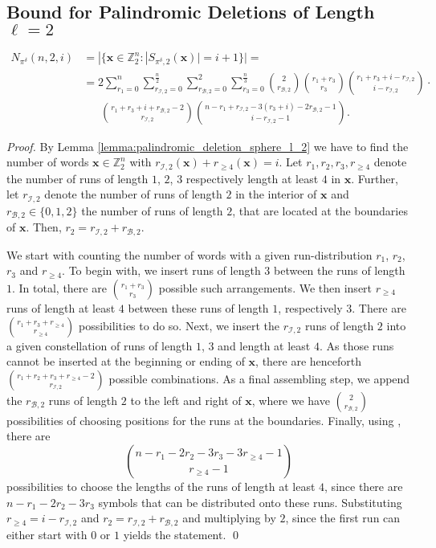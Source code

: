 \documentclass[a4paper]{llncs}
\newcommand{\ve}[1]{\boldsymbol{#1}}
\begin{document}
	\subsection{Bound for Palindromic Deletions of Length $\ell=2$}
	\begin{lemma}
		\begin{align*}
		N_{\pi^\delta}(n,2,i) &= |\{\ve{x} \in \mathbb{Z}_2^n : |S_{\pi^\delta, 2}(\ve{x})| = i+1 \}| = \\ &= 2 \sum_{r_1=0}^{n}\sum_{r_{\mathcal{I},2}=0}^{\frac{n}{2}} \sum_{r_{\mathcal{B},2} = 0}^2 \sum_{r_3=0}^{\frac{n}{3}} \binom{2}{r_{\mathcal{B},2}} \binom{r_1+r_3}{r_3} \binom{r_1+r_3+i-r_{\mathcal{I},2}}{i-r_{\mathcal{I},2}} \cdot \\  & \quad \;\; \binom{r_1+r_3+i + r_{\mathcal{B},2}-2}{r_{\mathcal{I},2}} \binom{n-r_1+r_{\mathcal{I},2}-3(r_3+i)-2r_{\mathcal{B},2}-1}{i-r_{\mathcal{I},2}-1} .
		\end{align*}
	\end{lemma}
	\begin{proof}
		By Lemma \ref{lemma:palindromic_deletion_sphere_l_2} we have to find the number of words $\ve{x}\in \mathbb{Z}_2^n$ with $r_{\mathcal{I},2}(\ve{x}) + r_{\geq 4}(\ve{x}) = i$. Let $r_1, r_2, r_3, r_{\geq 4}$ denote the number of runs of length $1$, $2$, $3$ respectively length at least $4$ in $\ve{x}$. Further, let $r_{\mathcal{I},2}$ denote the number of runs of length $2$ in the interior of $\ve{x}$ and $r_{\mathcal{B},2} \in \{0,1,2\}$ the number of runs of length $2$, that are located at the boundaries of $\ve{x}$. Then, $r_2 = r_{\mathcal{I},2} + r_{\mathcal{B},2}$.
		
		We start with counting the number of words with a given run-distribution $r_1$, $r_2$, $r_3$ and $r_{\geq 4}$. To begin with, we insert runs of length $3$ between the runs of length $1$. In total, there are $\binom{r_1+r_3}{r_3}$ possible such arrangements. We then insert $r_{\geq 4}$ runs of length at least $4$ between these runs of length $1$, respectively $3$. There are $\binom{r_1+r_3+r_{\geq 4}}{r_{\geq 4}}$ possibilities to do so. Next, we insert the $r_{\mathcal{I},2}$ runs of length $2$ into a given constellation of runs of length $1$, $3$ and length at least $4$. As those runs cannot be inserted at the beginning or ending of $\ve{x}$, there are henceforth $\binom{r_1+r_2+r_3 + r_{\geq 4}-2}{r_{\mathcal{I},2}}$ possible combinations. As a final assembling step, we append the $r_{\mathcal{B},2}$ runs of length $2$ to the left and right of $\ve{x}$, where we have $\binom{2}{r_{\mathcal{B},2}}$ possibilities of choosing positions for the runs at the boundaries. Finally, using \cite[Lemma 2.2]{Kulkarni13}, there are
		\begin{equation*}
		\binom{n-r_1-2r_2-3r_3-3r_{\geq 4}-1}{r_{\geq 4}-1}
		\end{equation*}
		possibilities to choose the lengths of the runs of length at least $4$, since there are $n-r_1-2r_2-3r_3$ symbols that can be distributed onto these runs. Substituting $r_{\geq 4} = i - r_{\mathcal{I},2}$ and $r_2 = r_{\mathcal{I},2} + r_{\mathcal{B},2}$ and multiplying by $2$, since the first run can either start with $0$ or $1$ yields the statement. \qed
	\end{proof}
\end{document}
